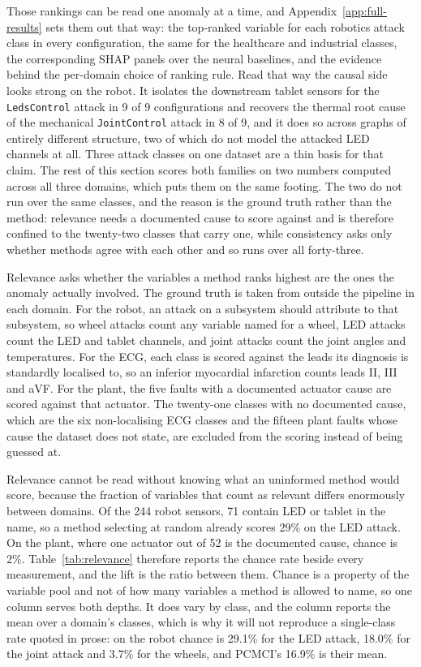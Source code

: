 Those rankings can be read one anomaly at a time, and Appendix~\ref{app:full-results} sets them out that way: the top-ranked variable for each robotics attack class in every configuration, the same for the healthcare and industrial classes, the corresponding SHAP panels over the neural baselines, and the evidence behind the per-domain choice of ranking rule. Read that way the causal side looks strong on the robot. It isolates the downstream tablet sensors for the \texttt{LedsControl} attack in 9 of 9 configurations and recovers the thermal root cause of the mechanical \texttt{JointControl} attack in 8 of 9, and it does so across graphs of entirely different structure, two of which do not model the attacked LED channels at all. Three attack classes on one dataset are a thin basis for that claim. The rest of this section scores both families on two numbers computed across all three domains, which puts them on the same footing. The two do not run over the same classes, and the reason is the ground truth rather than the method: relevance needs a documented cause to score against and is therefore confined to the twenty-two classes that carry one, while consistency asks only whether methods agree with each other and so runs over all forty-three.

Relevance asks whether the variables a method ranks highest are the ones the
anomaly actually involved. The ground truth is taken from outside the pipeline
in each domain. For the robot, an attack on a subsystem should attribute to
that subsystem, so wheel attacks count any variable named for a wheel, LED
attacks count the LED and tablet channels, and joint attacks count the joint
angles and temperatures. For the ECG, each class is scored against the leads
its diagnosis is standardly localised to, so an inferior myocardial infarction
counts leads II, III and aVF. For the plant, the five faults with a documented
actuator cause are scored against that actuator. The twenty-one classes with no documented cause, which are the six non-localising ECG
classes and the fifteen plant faults whose cause the dataset does not state,
are excluded from the scoring instead of being guessed at.

Relevance cannot be read without knowing what an uninformed method would score,
because the fraction of variables that count as relevant differs enormously
between domains. Of the 244 robot sensors, 71 contain LED or tablet in the
name, so a method selecting at random already scores 29\% on the LED attack.
On the plant, where one actuator out of 52 is the documented cause, chance is
2\%. Table~\ref{tab:relevance} therefore reports the chance rate beside
every measurement, and the lift is the ratio between them. Chance is a property of the variable pool and not of how many variables a method is allowed to name, so one column serves both depths. It does vary by class, and the column reports the mean over a domain's classes, which is why it will not reproduce a single-class rate quoted in prose: on the robot chance is 29.1\% for the LED attack, 18.0\% for the joint attack and 3.7\% for the wheels, and PCMCI's 16.9\% is their mean.

